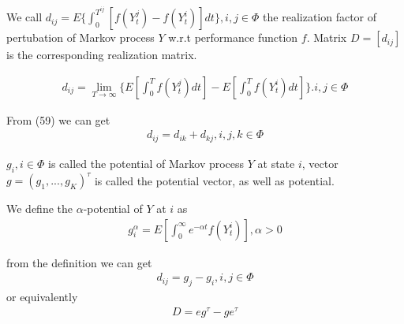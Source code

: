 \documentclass[runningheads]{llncs}
\begin{document}
    \begin{definition}
        We call $d_{ij} = E \{ \int_0^{T^{ij}} [ f(Y_t^j) - f(Y_t^i) ] dt \}, i, j \in \Phi$
        the realization factor of pertubation of Markov process $Y$ w.r.t performance function $f$.
        Matrix $D = [d_{ij}]$ is the corresponding realization matrix.
    \end{definition}

    \begin{lemma}
        \begin{align}
            d_{ij} = \mathop{\lim}_{T \rightarrow \infty} \{ E [ \int_0^T f(Y_t^j)dt ] -  E [ \int_0^T f(Y_t^i)dt ] \}. i, j \in \Phi
        \end{align}
    \end{lemma}
    \par
    From (59) we can get
    \begin{align}
        d_{ij} = d_{ik} + d_{kj}, i, j, k \in \Phi
    \end{align}
    \begin{definition}
        $g_i, i \in \Phi$ is called the potential of Markov process $Y$ at state $i$,
        vector $g = ( g_1, ..., g_K)^\tau$ is called the potential vector, as well as potential.
        \par
        We define the $\alpha$-potential of $Y$ at $i$ as
        \begin{align}
            g_i^\alpha = E [ \int_0^\infty e^{-\alpha t}f(Y_t^i)], \alpha > 0
        \end{align}
    \end{definition}
    from the definition we can get
    \begin{align}
        d_{ij} = g_j - g_i, i, j \in \Phi
    \end{align}
    or equivalently
    \begin{align}
        D = eg^\tau - ge^\tau
    \end{align}

    
\end{document}
